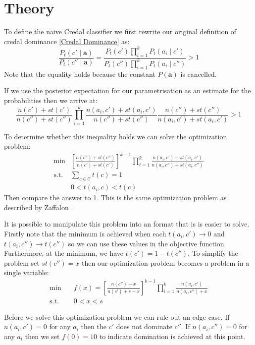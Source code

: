 \section{Theory}

To define the naive Credal classifier we first rewrite our original definition of credal dominance \cref{Credal Dominance} as:
\begin{equation}
	\frac{P_t(c' \mid \mathbf{a})}{P_t(c'' \mid \mathbf{a})} = \frac{P_t(c')\prod_{i=1}^{k}P_t(a_i \mid c')}{P_t(c'')\prod_{i=1}^{k}P_t(a_i \mid c'')} > 1
\end{equation}
Note that the equality holds because the constant $P(\mathbf{a})$ is cancelled.

If we use the posterior expectation for our parametrisation as an estimate for the probabilities then we arrive at:
\begin{equation}
	\frac{n(c')+st(c')}{n(c'')+st(c'')} \prod_{i=1}^k \frac{n(a_i, c') + st(a_i , c')}{n(c'') + st(c'')} \frac{n(c'') + st(c'')}{n(a_i, c') + st(a_i , c')} > 1
\end{equation}

To determine whether this inequality holds we can solve the optimization problem:
\begin{align}
	\min & \left[ \frac{n(c'')+st(c'')}{n(c')+st(c')} \right]^{k-1} \prod_{i=1}^k \frac{n(a_i, c') + st(a_i , c')}{n(a_i, c'') + st(a_i , c'')} \\
	\text{s.t.} & \sum_{c \in \mathcal{C}} t(c) = 1 \\
	& 0 < t(a_i, c) < t(c)
\end{align}
Then compare the answer to 1.
This is the same optimization problem as described by Zaffalon \cite{Zaffalon01}.

It is possible to manipulate this problem into an format that is is easier to solve.
Firstly note that the minimum is achieved when each $t(a_i, c') \rightarrow 0$ and $t(a_i, c'') \rightarrow t(c'')$ so we can use these values in the objective function.
Furthermore, at the minimum, we have $t(c') = 1 - t(c'')$.
To simplify the problem set $st(c'') = x$ then our optimization problem becomes a problem in a single variable:
\begin{align} \label{Credal Dominance Test}
	\min \quad & f(x) = \left[ \frac{n(c'') + x}{n(c') + s - x} \right]^{k-1} \prod_{i=1}^k \frac{n(a_i, c')}{n(a_i, c'') + x} \\
	\text{s.t.} \quad & 0 < x < s
\end{align}

Before we solve this optimization problem we can rule out an edge case.
If $n(a_i, c')=0$ for any $a_i$ then the $c'$ does not dominate $c''$.
If $n(a_i, c'')=0$ for any $a_i$ then we set $f(0)=10$ to indicate domination is achieved at this point.

